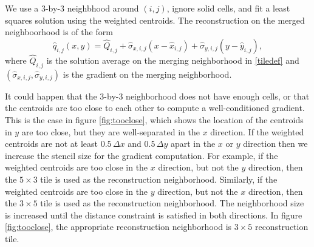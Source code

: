 \begin{enumerate}
We use a 3-by-3 neighbhood around $(i,j)$, ignore solid cells, and fit a least
squares solution using the weighted centroids.
The reconstruction on the merged neighboorhood is of the form
\begin{equation}
\widehat{q}_{i,j}(x,y) = \widehat{Q}_{i, j} + \widehat{\sigma}_{x,i,j}(x - \widehat{x}_{i,j}) + \widehat{\sigma}_{y,i,j}(y - \widehat{y}_{i,j}),
\end{equation}
where $\widehat{Q}_{i, j}$ is the solution average on the merging neighborhood in \eqref{tiledef} and $(\widehat{\sigma}_{x,i,j},\widehat{\sigma}_{y,i,j})$ is the gradient on the merging neighborhood.


It could happen that the 3-by-3 neighborhood does not have enough cells, or that
the centroids are too close to each other to compute a well-conditioned gradient.
This is the case in figure \ref{fig:tooclose}, which shows the location of the
centroids in $y$ are too close, but they are well-separated in the  $x$ direction. 
If the weighted centroids are not at least $0.5\,\Delta x$  and $0.5\,\Delta y$ 
apart in the $x$ or $y$ direction then we increase the stencil size for the 
gradient computation.  For example, if the weighted centroids are too close in the $x$ 
direction, but not the $y$ direction, then the $5\times 3$ tile is used as the 
reconstruction neighborhood.  Similarly, if the weighted centroids are too 
close in the $y$ direction, but not the $x$ direction, then the $3\times 5$ tile is 
used as the reconstruction neighborhood.  The neighborhood size is increased until the 
distance constraint is satisfied in both directions.  In figure \ref{fig:tooclose},
the appropriate reconstruction neighborhood is $3\times 5$ reconstruction tile.


\end{enumerate}

